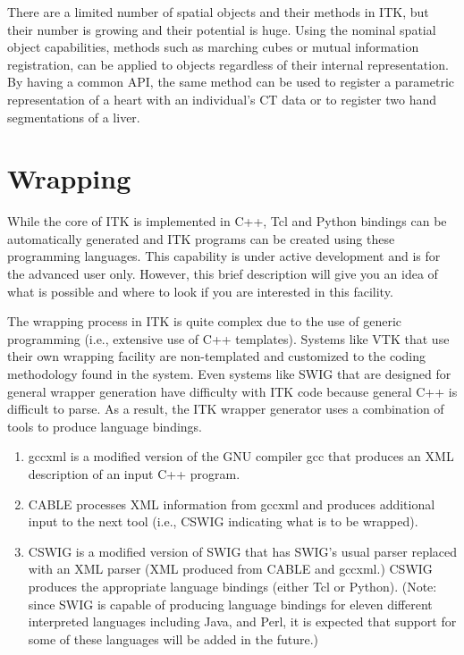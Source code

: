 There are a limited number of spatial objects and their methods in ITK, but
their number is growing and their potential is huge. Using the nominal
spatial object capabilities, methods such as marching cubes or mutual
information registration, can be applied to objects regardless of their
internal representation. By having a common API, the same method can be used
to register a parametric representation of a heart with an individual's CT
data or to register two hand segmentations of a liver.

%
%
%
\section{Wrapping}
\label{sec:Wrapping}


While the core of ITK is implemented in C++, Tcl and Python bindings can be
automatically generated and ITK programs can be created using these
programming languages. This capability is under active development and is for
the advanced user only. However, this brief description will give you an idea
of what is possible and where to look if you are interested in this facility.

The wrapping process in ITK is quite complex due to the use of generic
programming (i.e., extensive use of C++ templates). Systems like VTK that use
their own wrapping facility are non-templated and customized to the coding
methodology found in the system. Even systems like SWIG that are designed
for general wrapper generation have difficulty with ITK code because general
C++ is difficult to parse. As a result, the ITK wrapper generator uses a
combination of tools to produce language bindings.
\begin{enumerate}
  \item gccxml is a modified version of the GNU compiler gcc that
    produces an XML description of an input C++ program.
  \item  CABLE processes XML information from gccxml and produces
    additional input to the next tool (i.e., CSWIG indicating what is
    to be wrapped).
  \item CSWIG is a modified version of SWIG that has SWIG's usual
    parser replaced with an XML parser (XML produced from CABLE and
    gccxml.) CSWIG produces the appropriate language bindings
    (either Tcl or Python). (Note: since SWIG is capable of producing
    language bindings for eleven different interpreted languages including
    Java, and Perl, it is expected that support for some of these languages
    will be added in the future.)
\end{enumerate}

